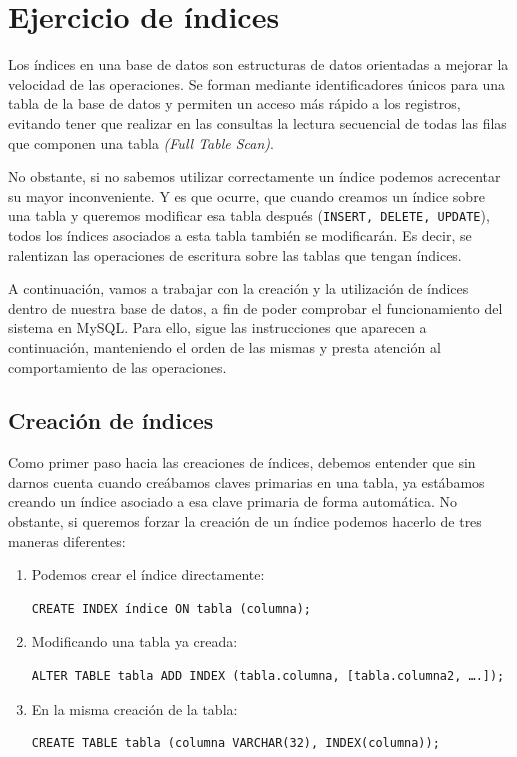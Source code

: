 \documentclass[a4paper]{article}
\begin{document}
\section*{Ejercicio de índices}

Los índices en una base de datos son estructuras de datos orientadas a mejorar la velocidad de las operaciones. Se forman mediante identificadores únicos para una tabla de la base de datos y permiten un acceso más rápido a los registros, evitando tener que realizar en las consultas la lectura secuencial de todas las filas que componen una tabla \textit{(Full Table Scan)}. 

No obstante, si no sabemos utilizar correctamente un índice podemos acrecentar su mayor inconveniente. Y es que ocurre, que cuando creamos un índice sobre una tabla y queremos modificar esa tabla después (\texttt{INSERT, DELETE, UPDATE}), todos los índices asociados a esta tabla también se modificarán. Es decir, se ralentizan las operaciones de escritura sobre las tablas que tengan índices. 

A continuación, vamos a trabajar con la creación y la utilización de índices dentro de nuestra base de datos, a fin de poder comprobar el funcionamiento del sistema en MySQL. Para ello, sigue las instrucciones que aparecen a continuación, manteniendo el orden de las mismas y presta atención al comportamiento de las operaciones. 

\subsection*{Creación de índices}

Como primer paso hacia las creaciones de índices, debemos entender que sin darnos cuenta cuando creábamos claves primarias en una tabla, ya estábamos creando un índice asociado a esa clave primaria de forma automática. No obstante, si queremos forzar la creación de un índice podemos hacerlo de tres maneras diferentes: 

\begin{enumerate}
    \item Podemos crear el índice directamente: 
    \begin{verbatim}
CREATE INDEX índice ON tabla (columna); 
    \end{verbatim}
        
    \item Modificando una tabla ya creada: 
    \begin{verbatim}
ALTER TABLE tabla ADD INDEX (tabla.columna, [tabla.columna2, ….]); 
    \end{verbatim} 

     \item En la misma creación de la tabla: 
     \begin{verbatim}
CREATE TABLE tabla (columna VARCHAR(32), INDEX(columna)); 
     \end{verbatim} 
\end{enumerate}
\end{document}
